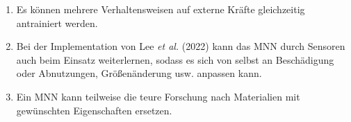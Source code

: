 \documentclass[10pt]{scrartcl}
\newcommand*{\eng}[1]{\textit{#1}}
\newcommand{\lee}{Lee {\itshape et al.} (2022)}
\begin{document}
\begin{enumerate}
    \item Es können mehrere Verhaltensweisen auf externe Kräfte gleichzeitig antrainiert werden.
    \item Bei der Implementation von \lee{} kann das MNN durch Sensoren auch beim Einsatz weiterlernen, sodass es sich von selbst an Beschädigung oder Abnutzungen, Größenänderung usw. anpassen kann.
    \item Ein MNN kann teilweise die teure Forschung nach Materialien mit gewünschten Eigenschaften ersetzen.
\end{enumerate}





\end{document}

